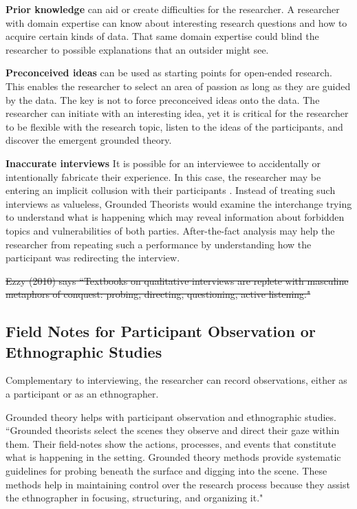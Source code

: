 \textbf{Prior knowledge} can aid or create difficulties for the researcher. A researcher with domain expertise can know about interesting research questions and how to acquire certain kinds of data. That same domain expertise could blind the researcher to possible explanations that an outsider might see.

\textbf{Preconceived ideas} can be used as starting points for open-ended research. This enables the researcher to select an area of passion as long as they are guided by the data. The key is not to force preconceived ideas onto the data. The researcher can initiate with an interesting idea, yet it is critical for the researcher to be flexible with the research topic, listen to the ideas of the participants, and discover the emergent grounded theory. 

\textbf{Inaccurate interviews} It is possible for an interviewee to accidentally or intentionally fabricate their experience. In this case, the researcher may be entering an implicit collusion with their participants \cite{Yanos2008CollusiveObjectification}. Instead of treating such interviews as valueless, Grounded Theorists would examine the interchange trying to understand what is happening which may reveal information about forbidden topics and vulnerabilities of both parties. After-the-fact analysis may help the researcher from repeating such a performance by understanding how the participant was redirecting the interview. 

\sout{Ezzy (2010) says ``Textbooks on qualitative interviews are replete with masculine metaphors of conquest: probing, directing, questioning, active listening."}
\subsection{Field Notes for Participant Observation or Ethnographic Studies}
Complementary to interviewing, the researcher can record observations, either as a participant or as an ethnographer.

Grounded theory helps with participant observation and ethnographic studies. ``Grounded theorists select the scenes they observe and direct their gaze within them. Their field-notes show the actions, processes, and events that constitute what is happening in the setting. Grounded theory methods provide systematic guidelines for probing beneath the surface and digging into the scene. These methods help in maintaining control over the research process because they assist the ethnographer in focusing, structuring, and organizing it." \cite{Charmaz}

